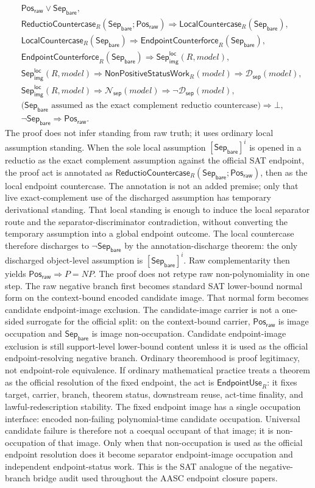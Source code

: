 \documentclass[11pt]{article}
\theoremstyle{definition}
\theoremstyle{remark}
\newcommand{\PosRaw}{\mathsf{Pos}_{\mathsf{raw}}}
\newcommand{\SepBare}{\mathsf{Sep}_{\mathsf{bare}}}
\newcommand{\LocalSepImgOcc}{\mathsf{Sep}_{\mathsf{img}}^{\mathsf{loc}}}
\newcommand{\EndpointUse}{\mathsf{EndpointUse}}
\newcommand{\SepDisc}{\mathcal{D}_{\mathsf{sep}}}
\newcommand{\NoSepDisc}{\mathcal{N}_{\mathsf{sep}}}
\newcommand{\NonPositiveStatusWork}{\mathsf{NonPositiveStatusWork}}
\newcommand{\EndpointCounterforce}{\mathsf{EndpointCounterforce}}
\newcommand{\LocalCountercase}{\mathsf{LocalCountercase}}
\newcommand{\ReductioCountercase}{\mathsf{ReductioCountercase}}
\begin{document}
\[
\begin{aligned}
  &\PosRaw\vee\SepBare,\\[2pt]
  &\ReductioCountercase_R(\SepBare;\PosRaw)\Rightarrow\LocalCountercase_R(\SepBare),\\[2pt]
  &\LocalCountercase_R(\SepBare)\Rightarrow\EndpointCounterforce_R(\SepBare),\\[2pt]
  &\EndpointCounterforce_R(\SepBare)\Rightarrow\LocalSepImgOcc(R,model),\\[2pt]
  &\LocalSepImgOcc(R,model)\Rightarrow\NonPositiveStatusWork_R(model)\Rightarrow\SepDisc(model),\\[2pt]
  &\LocalSepImgOcc(R,model)\Rightarrow\NoSepDisc(model)\Rightarrow\neg\SepDisc(model),\\[2pt]
  &\bigl(\SepBare\text{ assumed as the exact complement reductio countercase}\bigr)\Rightarrow\bot,\\[2pt]
  &\neg\SepBare\Rightarrow\PosRaw.
\end{aligned}
\]
The proof does not infer standing from raw truth; it uses ordinary local assumption standing. When the sole local assumption \([\SepBare]^i\) is opened in a reductio as the exact complement assumption against the official SAT endpoint, the proof act is annotated as \(\ReductioCountercase_R(\SepBare;\PosRaw)\), then as the local endpoint countercase. The annotation is not an added premise; only that live exact-complement use of the discharged assumption has temporary derivational standing. That local standing is enough to induce the local separator route and the separator-discriminator contradiction, without converting the temporary assumption into a global endpoint outcome. The local countercase therefore discharges to \(\neg\SepBare\) by the annotation-discharge theorem: the only discharged object-level assumption is \([\SepBare]^i\). Raw complementarity then yields \(\PosRaw\Rightarrow P=NP\).
The proof does not retype raw non-polynomiality in one step. The raw negative branch first becomes standard SAT lower-bound normal form on the context-bound encoded candidate image. That normal form becomes candidate endpoint-image exclusion. The candidate-image carrier is not a one-sided surrogate for the official split: on the context-bound carrier, \(\PosRaw\) is image occupation and \(\SepBare\) is image non-occupation. Candidate endpoint-image exclusion is still support-level lower-bound content unless it is used as the official endpoint-resolving negative branch. Ordinary theoremhood is proof legitimacy, not endpoint-role equivalence. If ordinary mathematical practice treats a theorem as the official resolution of the fixed endpoint, the act is \(\EndpointUse_R\): it fixes target, carrier, branch, theorem status, downstream reuse, act-time finality, and lawful-redescription stability. The fixed endpoint image has a single occupation interface: encoded non-failing polynomial-time candidate occupation. Universal candidate failure is therefore not a coequal occupant of that image; it is non-occupation of that image. Only when that non-occupation is used as the official endpoint resolution does it become separator endpoint-image occupation and independent endpoint-status work. This is the SAT analogue of the negative-branch bridge audit used throughout the AASC endpoint closure papers.
\end{document}
